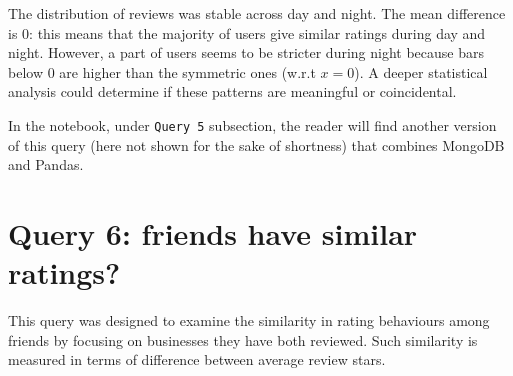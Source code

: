 \documentclass{Configuration_Files/PoliMi3i_thesis}
\begin{document}
\bigskip

The distribution of reviews was stable across day and night. The mean difference is $0$: this means that the majority of users give similar ratings during day and night. However, a part of users seems to be stricter during night because bars below $0$ are higher than the symmetric ones (w.r.t $x = 0$). A deeper statistical analysis could determine if these patterns are meaningful or coincidental.

In the notebook, under \texttt{Query 5} subsection, the reader will find another version of this query (here not shown for the sake of shortness) that combines MongoDB and Pandas.

\section{Query 6: friends have similar ratings?}
This query was designed to examine the similarity in rating behaviours among friends by focusing on businesses they have both reviewed. Such similarity is measured in terms of difference between average review stars.
\end{document}
